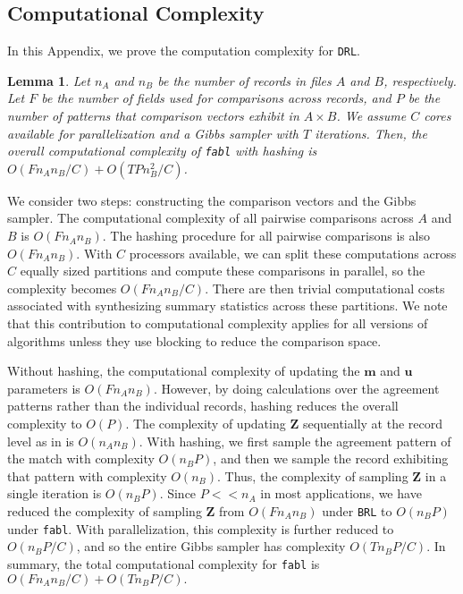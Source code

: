 \documentclass[12pt,letterpaper]{article}
\newcommand{\1}[1]{\mathbb{I}\!\left[#1\right]} %
\newtheorem{lemma}{Lemma}
\begin{document}
\subsection{Computational Complexity}

In this Appendix, we prove the computation complexity for \texttt{DRL}. 

\begin{lemma}\label{lemma:complexity}
		Let $n_A$ and $n_B$ be the number of records in files $A$ and $B$, respectively. Let $F$ be the number of fields used for comparisons across records, and $P$ be the number of patterns that comparison vectors exhibit in $A \times B$. We assume $C$ cores available for parallelization and a Gibbs sampler with $T$ iterations. Then, the overall computational complexity of \texttt{fabl} with hashing is $O(F n_A n_B /C) + O(T P n_B^2/ C)$.
\end{lemma}
	
		We consider two steps: constructing the comparison vectors and the Gibbs sampler. The computational complexity of all pairwise comparisons across $A$ and $B$ is $O(F n_A n_B)$. The hashing procedure for all pairwise comparisons is also $O(F n_A n_B)$. With $C$ processors available, we can split these computations across $C$ equally sized partitions and compute these comparisons in parallel, so the complexity becomes $O(F n_A n_B /C)$. There are then trivial computational costs associated with synthesizing summary statistics across these partitions. We note that this contribution to computational complexity applies for all versions of \cite{fellegi_theory_1969} algorithms unless they use blocking to reduce the comparison space.
			
			Without hashing, the computational complexity of updating the $\bm{m}$ and $\bm{u}$ parameters is $O(F n_A n_B)$. However, by doing calculations over the agreement patterns rather than the individual records, hashing reduces the overall complexity to $O(P)$. The complexity of updating $\bm{Z}$ sequentially at the record level as in \cite{sadinle_bayesian_2017} is $O(n_A n_B)$. With hashing, we first sample the agreement pattern of the match with complexity $O(n_B P)$, and then we sample the record exhibiting that pattern with complexity $O(n_B)$. Thus, the complexity of sampling $\bm{Z}$ in a single iteration is $O(n_B P)$. Since $P << n_A$ in most applications, we have reduced the complexity of sampling $\bm{Z}$ from $O(F n_A n_B)$ under \texttt{BRL} to $O(n_B P)$ under \texttt{fabl}. With parallelization, this complexity is further reduced to $O(n_B P /C)$, and so the entire Gibbs sampler has complexity $O(T n_B P / C).$
			In summary, the total computational complexity for \texttt{fabl} is $O(F n_A n_B / C) + O(T n_B P / C).$
\end{document}
